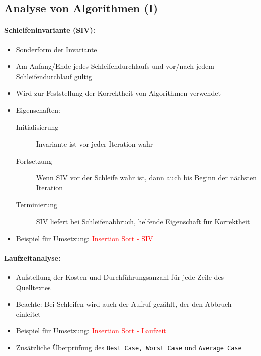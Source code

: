 \documentclass[
    ngerman,
    color=3b,
    dark_mode,
    load_common, %
    summary,
    boxarc,
]{rubos-tuda-template}
\begin{document}
\subsection{Analyse von Algorithmen \textmd{(I)}}\label{Analyse von Algorithmen 1}
\paragraph{Schleifeninvariante \textmd{(SIV)}:}
\begin{itemize}
    \item Sonderform der Invariante
    \item Am Anfang/Ende jedes Schleifendurchlaufs und vor/nach jedem Schleifendurchlauf gültig
    \item Wird zur Feststellung der Korrektheit von Algorithmen verwendet
    \item Eigenschaften:
          \begin{description}
              \item [Initialisierung] Invariante ist vor jeder Iteration wahr
              \item [Fortsetzung] Wenn SIV vor der Schleife wahr ist, dann auch bis Beginn der nächsten Iteration
              \item [Terminierung] SIV liefert bei Schleifenabbruch, helfende Eigenschaft für Korrektheit
          \end{description}
    \item Beispiel für Umsetzung: \hyperref[insSortSiv]{\textcolor{red}{Insertion Sort - SIV}}
\end{itemize}

\paragraph{Laufzeitanalyse:}
\begin{itemize}
    \item Aufstellung der Kosten und Durchführungsanzahl für jede Zeile des Quelltextes
    \item Beachte: Bei Schleifen wird auch der Aufruf gezählt, der den Abbruch einleitet
    \item Beispiel für Umsetzung: \hyperref[insSortLaufzeit]{\textcolor{red}{Insertion Sort - Laufzeit}}
    \item Zusätzliche Überprüfung des \texttt{Best Case, Worst Case} und \texttt{Average Case}
\end{itemize}
\end{document}
